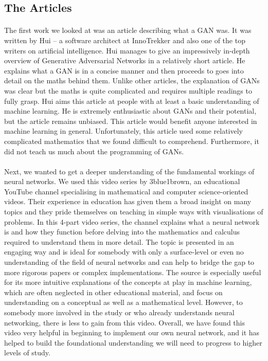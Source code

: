\documentclass{article}
\begin{document}
\subsection{The Articles}
\paragraph{}
The first work we looked at was an article\cite{whatisgan} describing what a GAN was. It was written by Hui – a software architect at InnoTrekker and also one of the top writers on artificial intelligence. Hui manages to give an impressively in-depth overview of Generative Adversarial Networks in a relatively short article. He explains what a GAN is in a concise manner and then proceeds to goes into detail on the maths behind them. Unlike other articles, the explanation of GANs was clear but the maths is quite complicated and requires multiple readings to fully grasp. Hui aims this article at people with at least a basic understanding of machine learning. He is extremely enthusiastic about GANs and their potential, but the article remains unbiased. This article would benefit anyone interested in machine learning in general. Unfortunately, this article used some relatively complicated mathematics that we found difficult to comprehend. Furthermore, it did not teach us much about the programming of GANs. 

\paragraph{}
Next, we wanted to get a deeper understanding of the fundamental workings of neural networks. We used this\cite{video} video series by 3blue1brown, an educational YouTube channel specialising in mathematical and computer science-oriented videos. Their experience in education has given them a broad insight on many topics and they pride themselves on teaching in simple ways with visualisations of problems. In this 4-part video series, the channel explains what a neural network is and how they function before delving into the mathematics and calculus required to understand them in more detail. The topic is presented in an engaging way and is ideal for somebody with only a surface-level or even no understanding of the field of neural networks and can help to bridge the gap to more rigorous papers or complex implementations. The source is especially useful for its more intuitive explanations of the concepts at play in machine learning, which are often neglected in other educational material, and focus on understanding on a conceptual as well as a mathematical level. However, to somebody more involved in the study or who already understands neural networking, there is less to gain from this video. Overall, we have found this video very helpful in beginning to implement our own neural network, and it has helped to build the foundational understanding we will need to progress to higher levels of study.
\end{document}
